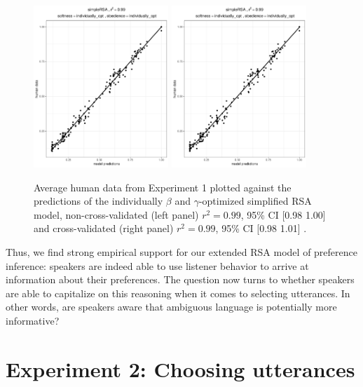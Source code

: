 \documentclass[10pt,a4paper]{article}
\begin{document}
\begin{figure}[ht]
	\centering
	\includegraphics[width=2in]{images/m5.pdf}
	\includegraphics[width=2in]{images/m8.pdf}
	\caption{Average human data from Experiment 1 plotted against the predictions of the individually $\beta$ and $\gamma$-optimized simplified RSA model, non-cross-validated (left panel) $r^{2}=0.99$, 95\% CI [0.98 1.00] and cross-validated (right panel) $r^{2}=0.99$, 95\% CI [0.98 1.01] .}\label{cross-validation}
\end{figure}


Thus, we find strong empirical support for our extended RSA model of preference inference: speakers are indeed able to use listener behavior to arrive at information about their preferences. The question now turns to whether speakers are able to capitalize on this reasoning when it comes to selecting utterances. In other words, are speakers aware that ambiguous language is potentially more informative?


\section{Experiment 2: Choosing utterances}
\end{document}
